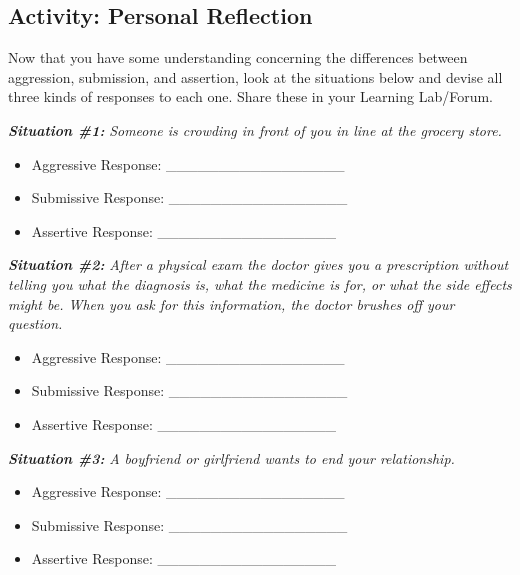\documentclass[
]{book}
\providecommand{\tightlist}{%
  \setlength{\itemsep}{0pt}\setlength{\parskip}{0pt}}
\begin{document}
\hypertarget{activity-personal-reflection}{%
\subsection*{Activity: Personal Reflection}\label{activity-personal-reflection}}

\begin{reflect}
Now that you have some understanding concerning the differences between aggression, submission, and assertion, look at the situations below and devise all three kinds of responses to each one. Share these in your Learning Lab/Forum.

\textbf{\emph{Situation \#1:}} \emph{Someone is crowding in front of you in line at the grocery store.}

\begin{itemize}
\tightlist
\item
  Aggressive Response: \_\_\_\_\_\_\_\_\_\_\_\_\_\_\_\_\_\\
\item
  Submissive Response: \_\_\_\_\_\_\_\_\_\_\_\_\_\_\_\_\_\\
\item
  Assertive Response: \_\_\_\_\_\_\_\_\_\_\_\_\_\_\_\_\_
\end{itemize}

\textbf{\emph{Situation \#2:}} \emph{After a physical exam the doctor gives you a prescription without telling you what the diagnosis is, what the medicine is for, or what the side effects might be. When you ask for this information, the doctor brushes off your question.}

\begin{itemize}
\tightlist
\item
  Aggressive Response: \_\_\_\_\_\_\_\_\_\_\_\_\_\_\_\_\_\\
\item
  Submissive Response: \_\_\_\_\_\_\_\_\_\_\_\_\_\_\_\_\_\\
\item
  Assertive Response: \_\_\_\_\_\_\_\_\_\_\_\_\_\_\_\_\_
\end{itemize}

\textbf{\emph{Situation \#3:}} \emph{A boyfriend or girlfriend wants to end your relationship.}

\begin{itemize}
\tightlist
\item
  Aggressive Response: \_\_\_\_\_\_\_\_\_\_\_\_\_\_\_\_\_\\
\item
  Submissive Response: \_\_\_\_\_\_\_\_\_\_\_\_\_\_\_\_\_\\
\item
  Assertive Response: \_\_\_\_\_\_\_\_\_\_\_\_\_\_\_\_\_
\end{itemize}


\end{reflect}
\end{document}
